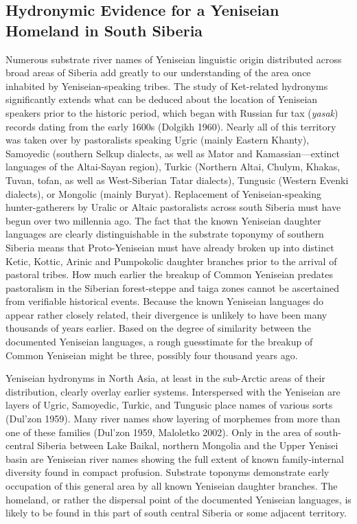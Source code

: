 \subsection{Hydronymic Evidence for a Yeniseian Homeland in South Siberia}


Numerous substrate river names of Yeniseian linguistic origin distributed across broad areas of Siberia add greatly to our understanding of the area once inhabited by Yeniseian-speaking tribes. The study of Ket-related hydronyms significantly extends what can be deduced about the location of Yeniseian speakers prior to the historic period, which began with Russian fur tax (\textit{yasak}) records dating from the early 1600s (Dolgikh 1960). Nearly all of this territory was taken over by pastoralists speaking Ugric (mainly Eastern Khanty), Samoyedic (southern Selkup dialects, as well as Mator and Kamassian---extinct languages of the Altai-Sayan region), Turkic (Northern Altai, Chulym, Khakas, Tuvan, tofan, as well as West-Siberian Tatar dialects), Tungusic (Western Evenki dialects), or Mongolic (mainly Buryat). Replacement of Yeniseian-speaking hunter-gatherers by Uralic or Altaic pastoralists across south Siberia must have begun over two millennia ago. The fact that the known Yeniseian daughter languages are clearly distinguishable in the substrate toponymy of southern Siberia means that Proto-Yeniseian must have already broken up into distinct Ketic, Kottic, Arinic and Pumpokolic daughter branches prior to the arrival of pastoral tribes. How much earlier the breakup of Common Yeniseian predates pastoralism in the Siberian forest-steppe and taiga zones cannot be ascertained from verifiable historical events. Because the known Yeniseian languages do appear rather closely related, their divergence is unlikely to have been many thousands of years earlier. Based on the degree of similarity between the documented Yeniseian languages, a rough guesstimate for the breakup of Common Yeniseian might be three, possibly four thousand years ago.

Yeniseian hydronyms in North Asia, at least in the sub-Arctic areas of their distribution, clearly overlay earlier systems. Interspersed with the Yeniseian are layers of Ugric, Samoyedic, Turkic, and Tungusic place names of various sorts (Dul’zon 1959). Many river names show layering of morphemes from more than one of these families (Dul’zon 1959, Maloletko 2002). Only in the area of south-central Siberia between Lake Baikal, northern Mongolia and the Upper Yenisei basin are Yeniseian river names showing the full extent of known family-internal diversity found in compact profusion. Substrate toponyms demonstrate early occupation of this general area by all known Yeniseian daughter branches. The homeland, or rather the dispersal point of the documented Yeniseian languages, is likely to be found in this part of south central Siberia or some adjacent territory.

